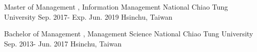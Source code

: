 

\begin{cventries}

  \cventry
    {Master of Management , Information Management} %
    {National Chiao Tung University} %
    {Sep. 2017- Exp. Jun. 2019} %
    {Hsinchu, Taiwan} %
    {
    }

  \cventry
    {Bachelor of Management , Management Science} %
    {National Chiao Tung University} %
    { Sep. 2013- Jun. 2017} %
    {Hsinchu, Taiwan} %
    {
    }

\end{cventries}